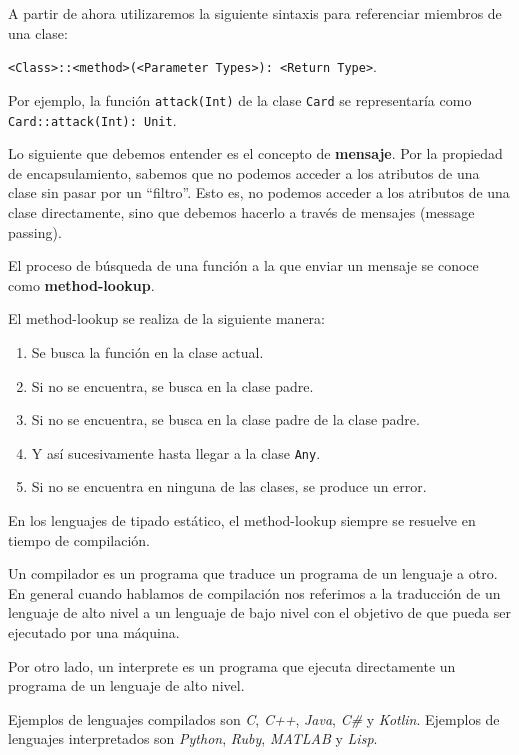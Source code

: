   \begin{note}
    A partir de ahora utilizaremos la siguiente sintaxis para referenciar miembros de una clase:
    
    \texttt{<Class>::<method>(<Parameter Types>): <Return Type>}.
    
    Por ejemplo, la función \texttt{attack(Int)} de la clase \texttt{Card} se representaría como
    \texttt{Card::attack(Int): Unit}.
  \end{note}

  Lo siguiente que debemos entender es el concepto de \textbf{mensaje}.
  Por la propiedad de encapsulamiento, sabemos que no podemos acceder a los 
  atributos de una clase sin pasar por un \enquote{filtro}.
  Esto es, no podemos acceder a los atributos de una clase directamente, sino que debemos hacerlo
  a través de mensajes (message passing).

  \begin{defaultbox}
    El proceso de búsqueda de una función a la que enviar un mensaje se conoce como 
    \textbf{method-lookup}.

    El method-lookup se realiza de la siguiente manera:
    \begin{enumerate}
      \item Se busca la función en la clase actual.
      \item Si no se encuentra, se busca en la clase padre.
      \item Si no se encuentra, se busca en la clase padre de la clase padre.
      \item Y así sucesivamente hasta llegar a la clase \texttt{Any}.
      \item Si no se encuentra en ninguna de las clases, se produce un error.
    \end{enumerate}
    
    En los lenguajes de tipado estático, el method-lookup siempre se resuelve en tiempo de 
    compilación.
  \end{defaultbox}

  \begin{note}
    Un compilador es un programa que traduce un programa de un lenguaje a otro.
    En general cuando hablamos de compilación nos referimos a la traducción de un lenguaje de alto 
    nivel a un lenguaje de bajo nivel con el objetivo de que pueda ser ejecutado por una máquina.
    
    Por otro lado, un interprete es un programa que ejecuta directamente un 
    programa de un lenguaje de alto nivel.

    Ejemplos de lenguajes compilados son \textit{C}, \textit{C++}, \textit{Java}, \textit{C\#} y
    \textit{Kotlin}.
    Ejemplos de lenguajes interpretados son \textit{Python}, \textit{Ruby}, \textit{MATLAB} y
    \textit{Lisp}.
  \end{note}

